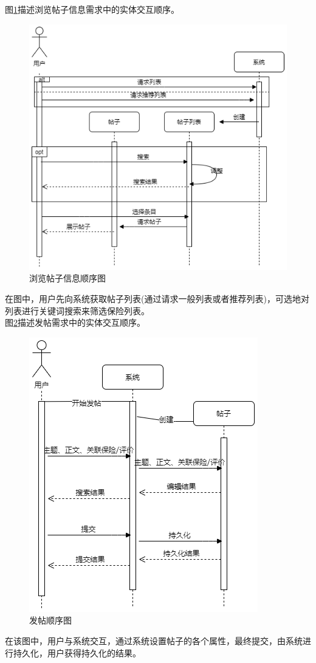 \documentclass[a4paper]{ctexart}
\begin{document}
图\ref{fig:浏览帖子信息顺序图}描述浏览帖子信息需求中的实体交互顺序。
\begin{figure}[H]
\centering
\includegraphics[scale=0.4]{image/2_6顺序图.png}
\caption{浏览帖子信息顺序图}
\label{fig:浏览帖子信息顺序图}
\end{figure}
在图中，用户先向系统获取帖子列表(通过请求一般列表或者推荐列表)，可选地对列表进行关键词搜索来筛选保险列表。\\

图\ref{fig:发帖顺序图}描述发帖需求中的实体交互顺序。
\begin{figure}[H]
\centering
\includegraphics[scale=0.5]{image/2_7顺序图.png}
\caption{发帖顺序图}
\label{fig:发帖顺序图}
\end{figure}
在该图中，用户与系统交互，通过系统设置帖子的各个属性，最终提交，由系统进行持久化，用户获得持久化的结果。\\
\end{document}
